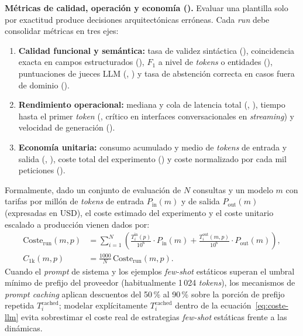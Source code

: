 \textbf{Métricas de calidad, operación y economía ().} Evaluar una plantilla solo por exactitud produce decisiones arquitectónicas erróneas. Cada \textit{run} debe consolidar métricas en tres ejes:
\begin{enumerate}
  \item \textbf{Calidad funcional y semántica:} tasa de validez sintáctica (), coincidencia exacta en campos estructurados (), $F_1$ a nivel de \textit{tokens} o entidades (), puntuaciones de jueces LLM (, ) y tasa de abstención correcta en casos fuera de dominio ().
  \item \textbf{Rendimiento operacional:} mediana y cola de latencia total (, ), tiempo hasta el primer \textit{token} (, crítico en interfaces conversacionales en \textit{streaming}) y velocidad de generación ().
  \item \textbf{Economía unitaria:} consumo acumulado y medio de \textit{tokens} de entrada y salida (, ), coste total del experimento () y coste normalizado por cada mil peticiones ().
\end{enumerate}

Formalmente, dado un conjunto de evaluación de $N$ consultas y un modelo $m$ con tarifas por millón de \textit{tokens} de entrada $P_{\text{in}}(m)$ y de salida $P_{\text{out}}(m)$ (expresadas en USD), el coste estimado del experimento y el coste unitario escalado a producción vienen dados por:
\begin{align}\label{eq:coste-llm}
  \text{Coste}_{\text{run}}(m, p) &= \sum_{i=1}^{N} \left( \frac{T^{\text{in}}_{i}(p)}{10^{6}} \cdot P_{\text{in}}(m) + \frac{T^{\text{out}}_{i}(m, p)}{10^{6}} \cdot P_{\text{out}}(m) \right), \\
  C_{1\text{k}}(m, p) &= \frac{1000}{N} \, \text{Coste}_{\text{run}}(m, p). \nonumber
\end{align}
Cuando el \textit{prompt} de sistema y los ejemplos \textit{few-shot} estáticos superan el umbral mínimo de prefijo del proveedor (habitualmente 1\,024 \textit{tokens}), los mecanismos de \textit{prompt caching} aplican descuentos del 50\,\% al 90\,\% sobre la porción de prefijo repetida $T^{\text{cached}}_{i}$; modelar explícitamente $T^{\text{cached}}_{i}$ dentro de la ecuación~\eqref{eq:coste-llm} evita sobrestimar el coste real de estrategias \textit{few-shot} estáticas frente a las dinámicas.

